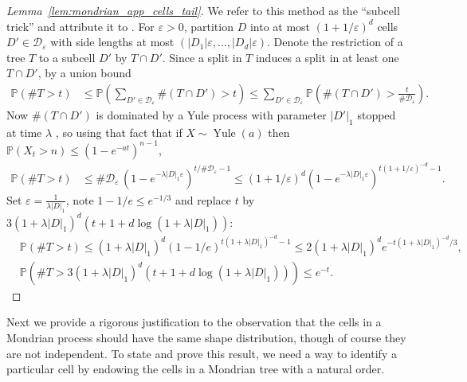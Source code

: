\documentclass[11pt,lof]{puthesis}
\renewcommand{\P}{\ensuremath{\mathbb{P}}}
\newcommand{\cD}{\ensuremath{\mathcal{D}}}
\DeclareMathOperator{\Yule}{Yule}
\theoremstyle{break}
\theoremstyle{proof}
\newtheorem{proof}{Proof}
\begin{document}
\begin{proof}[Lemma~\ref{lem:mondrian_app_cells_tail}]

We refer to this method as the ``subcell trick''
and attribute it to \citet{mourtada2017universal}.
For $\varepsilon > 0$, partition $D$ into
at most $(1 + 1/\varepsilon)^d$ cells $D' \in \cD_\varepsilon$
with side lengths at most $(|D_1| \varepsilon, \ldots, |D_d| \varepsilon)$.
Denote the restriction of a tree $T$ to a subcell $D'$ by $T \cap D'$.
Since a split in $T$ induces a split in at least one $T \cap D'$,
by a union bound
%
\begin{align*}
\P\left(\# T > t \right)
&\leq
\P\left(\sum_{D' \in \cD_\varepsilon}
\# (T \cap D') > t \right)
\leq
\sum_{D' \in \cD_\varepsilon}
\P\left(
\# (T \cap D') >
\frac{t}{\# \cD_\varepsilon}
\right).
\end{align*}
%
Now $\# (T \cap D')$ is dominated by a Yule process
with parameter $|D'|_1$ stopped at time $\lambda$
\citep[proof of Lemma~2]{mourtada2017universal},
so using that fact that if
$X \sim \Yule(a)$
then $\P(X_t > n) \leq (1-e^{-at})^{n-1}$,
%
\begin{align*}
\P\left(\# T > t \right)
&\leq
\# \cD_\varepsilon \,
(1 - e^{-\lambda |D|_1 \varepsilon})^{t / \# \cD_\varepsilon - 1}
\leq
(1 + 1/\varepsilon)^d
(1 - e^{-\lambda |D|_1 \varepsilon})^{t (1 + 1/\varepsilon)^{-d} - 1}.
\end{align*}
%
Set $\varepsilon = \frac{1}{\lambda |D|_1}$,
note $1-1/e \leq e^{-1/3}$
and replace $t$ by
$3 (1 + \lambda |D|_1)^d
(t + 1 + d \log(1 + \lambda |D|_1))$:
%
\begin{align*}
&\P\left(\# T > t \right)
\leq
(1 + \lambda |D|_1)^d
(1 - 1/e)^{t (1 + \lambda |D|_1)^{-d} - 1}
\leq
2 (1 + \lambda |D|_1)^d
e^{-t (1 + \lambda |D|_1)^{-d} / 3}, \\
&\P\left(\# T >
3
(1 + \lambda |D|_1)^d
(t + 1 + d \log(1 + \lambda |D|_1))
\right)
\leq
e^{-t}.
\end{align*}
%
\end{proof}

Next we provide a rigorous justification to the observation that the cells
in a Mondrian process should have the same shape distribution, though
of course they are not independent. To state and prove this result,
we need a way to identify a particular cell by endowing the
cells in a Mondrian tree with a natural order.
\end{document}
